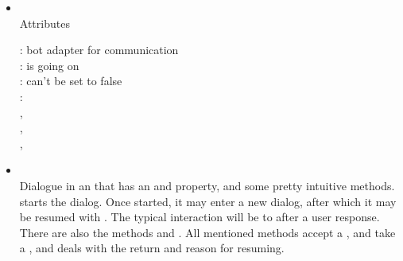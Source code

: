 \documentclass{article}
\begin{document}

\begin{itemize}

\item {}\\
    Attributes
    \begin{itemize}
        : bot adapter for communication \\
        : is going on  \\
        : can't be set to false \\
        :  \\
        , \\
        , \\
        , \\
    \end{itemize}

\end{itemize}

\begin{itemize}

\item {}\\
    Dialogue in an  that has an  and  property, and some pretty intuitive methods.   starts the dialog.  Once started, it may enter a new dialog, after which it may be resumed with .  The typical interaction will be to  after a user response.  There are also the methods  and .  All mentioned methods accept a ,  and  take a , and  deals with the return and reason for resuming.

\end{itemize}
\end{document}
